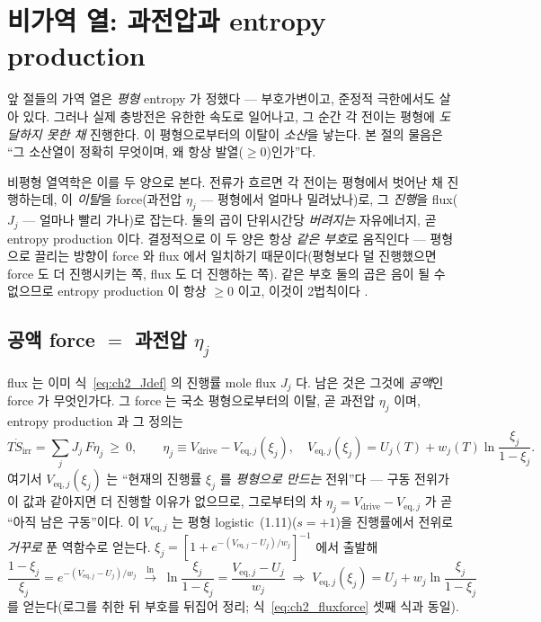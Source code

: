 \documentclass[11pt,a4paper]{article}
\newcommand{\eq}{\mathrm{eq}}
\newcommand{\drive}{\mathrm{drive}}
\newcommand{\irr}{\mathrm{irr}}
\begin{document}
\section{비가역 열: 과전압과 entropy production}\label{sec:ch2_irr}
앞 절들의 가역 열은 \emph{평형} entropy 가 정했다 — 부호가변이고, 준정적 극한에서도 살아 있다. 그러나 실제 충방전은
유한한 속도로 일어나고, 그 순간 각 전이는 평형에 \emph{도달하지 못한 채} 진행한다. 이 평형으로부터의 이탈이
\emph{소산}을 낳는다. 본 절의 물음은 ``그 소산열이 정확히 무엇이며, 왜 항상 발열($\ge0$)인가''다.

비평형 열역학은 이를 두 양으로 본다. 전류가 흐르면 각 전이는 평형에서 벗어난 채 진행하는데, 이 \emph{이탈}을
force(과전압 $\eta_j$ — 평형에서 얼마나 밀려났나)로, 그 \emph{진행}을 flux($J_j$ — 얼마나 빨리 가나)로 잡는다.
둘의 곱이 단위시간당 \emph{버려지는} 자유에너지, 곧 entropy production 이다. 결정적으로 이 두 양은 항상 \emph{같은
부호}로 움직인다 — 평형으로 끌리는 방향이 force 와 flux 에서 일치하기 때문이다(평형보다 덜 진행했으면 force 도 더
진행시키는 쪽, flux 도 더 진행하는 쪽). 같은 부호 둘의 곱은 음이 될 수 없으므로 entropy production 이 항상 $\ge0$
이고, 이것이 2법칙이다 \cite{degrootmazur1962,onsager1931}.

\subsection{공액 force $=$ 과전압 $\eta_j$}\label{sec:ch2_fluxforce}
flux 는 이미 식~\eqref{eq:ch2_Jdef} 의 진행률 mole flux $J_j$ 다. 남은 것은 그것에 \emph{공액}인 force 가
무엇인가다. 그 force 는 국소 평형으로부터의 이탈, 곧 과전압 $\eta_j$ 이며, entropy production 과 그 정의는
\begin{equation}
T\dot S_{\irr}=\sum_j J_j\,F\eta_j\ \ge\ 0,\qquad
\eta_j\equiv V_\drive-V_{\eq,j}(\xi_j),\quad V_{\eq,j}(\xi_j)=U_j(T)+w_j(T)\ln\frac{\xi_j}{1-\xi_j}.
\label{eq:ch2_fluxforce}
\end{equation}
여기서 $V_{\eq,j}(\xi_j)$ 는 ``현재의 진행률 $\xi_j$ 를 \emph{평형으로 만드는} 전위''다 — 구동 전위가 이 값과
같아지면 더 진행할 이유가 없으므로, 그로부터의 차 $\eta_j=V_\drive-V_{\eq,j}$ 가 곧 ``아직 남은 구동''이다. 이
$V_{\eq,j}$ 는 평형 logistic~(1.11)($s=+1$)을 진행률에서 전위로 \emph{거꾸로} 푼 역함수로 얻는다.
$\xi_j=[1+e^{-(V_{\eq,j}-U_j)/w_j}]^{-1}$ 에서 출발해
\begin{equation}
\frac{1-\xi_j}{\xi_j}=e^{-(V_{\eq,j}-U_j)/w_j}
\;\xrightarrow{\ \ln\ }\;
\ln\frac{\xi_j}{1-\xi_j}=\frac{V_{\eq,j}-U_j}{w_j}
\;\Longrightarrow\;
V_{\eq,j}(\xi_j)=U_j+w_j\ln\frac{\xi_j}{1-\xi_j}
\label{eq:ch2_Veqinv}
\end{equation}
를 얻는다(로그를 취한 뒤 부호를 뒤집어 정리; 식~\eqref{eq:ch2_fluxforce} 셋째 식과 동일).
\end{document}

